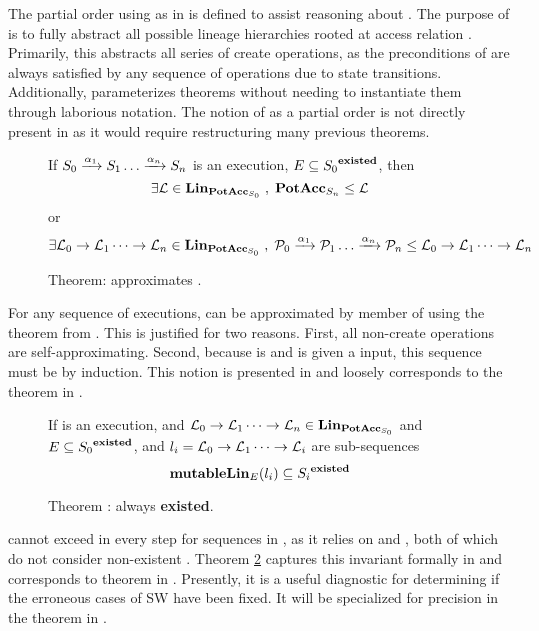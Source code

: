 The partial order  using \ProjPotAcc{} as in  is defined to assist reasoning about \mutableLineage{}.
The purpose of  is to fully abstract all possible lineage hierarchies rooted at access relation .
Primarily, this abstracts all series of create operations, as the preconditions of  are always satisfied by any sequence of operations due to state transitions.
Additionally,  parameterizes theorems without needing to instantiate them through laborious notation.
The notion of  as a partial order is not directly present in \TMmodelName{} as it would require restructuring many previous theorems.

\begin{figure}
If \(S_0 \xrightarrow {\alpha_1} S_1 \dots \xrightarrow {\alpha_{n}} S_{n}\) is an execution, \(E \subseteq {S_0}^{\mathbf{existed}}\), then
\[
\exists \mathcal{L} \in \mathbf{Lin}_{\mathbf{PotAcc}_{S_0}} \;,\; \mathbf{PotAcc}_{S_n} \leq \mathcal{L}
\]
or 
\[
\exists \mathcal{L}_0 \rightarrow \mathcal{L}_1 \dots \rightarrow \mathcal{L}_{n} \in \mathbf{Lin}_{\mathbf{PotAcc}_{S_0}} \;,\; \mathcal{P}_0 \xrightarrow {\alpha_1} \mathcal{P}_1 \dots \xrightarrow {\alpha_{n}} \mathcal{P}_{n} \leq \mathcal{L}_0 \rightarrow \mathcal{L}_1 \dots \rightarrow \mathcal{L}_{n}
\]
\caption{Theorem: \lineage{} approximates \potacc{}. \label{thm:SW:ProjPotAccApprox}}
\end{figure}

For any sequence of executions,  can be approximated by member of  using the theorem from .
This is justified for two reasons.  First, all non-create operations are self-approximating.  
Second, because  is \maximal{} and \ProjPotAcc{} is \maximal{} given a \maximal{} input, this sequence must be \maximal{} by induction.
This notion is presented in  and loosely corresponds to the \TMmodelName{} theorem \COQmutableExecuteDirAccSubsetPotAcc{} in .

\begin{figure}
If  is an execution, 
and \(\mathcal{L}_0 \rightarrow \mathcal{L}_1 \dots \rightarrow \mathcal{L}_{n} \in \mathbf{Lin}_{\mathbf{PotAcc}_{S_0}}\)
and \(E \subseteq {S_0}^{\mathbf{existed}}\), 
and \( l_i = \mathcal{L}_0 \rightarrow \mathcal{L}_1 \dots \rightarrow \mathcal{L}_{i}\) are sub-sequences
\[
\mathbf{mutableLin}_{E}(l_i) \subseteq {S_i}^{\mathbf{existed}}
\]
\caption{Theorem : \mutableLineage{} always {\bf existed}.\label{SW:thm:mutableLineageExisted}}
\end{figure}

 cannot exceed  in every step for sequences in , as it relies on \potacc{} and \ProjPotAcc{}, both of which do not consider non-existent \TMobjs{}.
Theorem \ref{SW:thm:mutableLineageExisted} captures this invariant formally in  and corresponds to \COQagNodesSpecEndow{} theorem in \TMmodelName{}.
Presently, it is a useful diagnostic for determining if the erroneous cases of SW \thmauthred{} have been fixed.
It will be specialized for precision in the theorem in .

